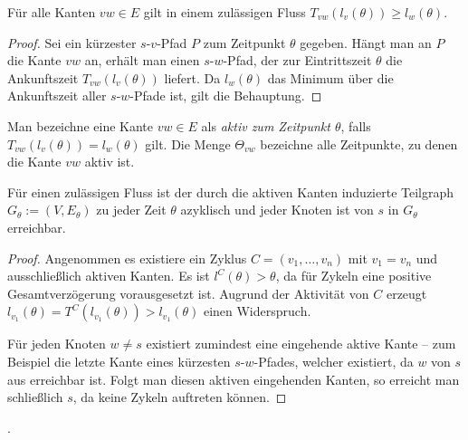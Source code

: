 \begin{lemma}\label{lemma-dreicksungl}
	Für alle Kanten $vw\in E$ gilt in einem zulässigen Fluss 
	$T_{vw}(l_v(\theta)) \geq l_w(\theta)$.
\end{lemma}
\begin{proof}
	Sei ein kürzester $s$-$v$-Pfad $P$ zum Zeitpunkt $\theta$ gegeben.
	Hängt man an $P$ die Kante $vw$ an, erhält man einen $s$-$w$-Pfad, der zur Eintrittszeit $\theta$ die Ankunftszeit $T_{vw}(l_v(\theta))$ liefert.
	Da $l_w(\theta)$ das Minimum über die Ankunftszeit aller $s$-$w$-Pfade ist, gilt die Behauptung.
\end{proof}

\begin{definition}
	Man bezeichne eine Kante $vw\in E$ als \emph{aktiv zum Zeitpunkt $\theta$}, falls $T_{vw}(l_v(\theta)) = l_w(\theta)$ gilt.
	Die Menge $\Theta_{vw}$ bezeichne alle Zeitpunkte, zu denen die Kante $vw$ aktiv ist.
\end{definition}

\begin{lemma}\label{lemma-shortest-path-using-active-edges}
	Für einen zulässigen Fluss ist der durch die aktiven Kanten induzierte Teilgraph $G_\theta:=(V, E_\theta)$ zu jeder Zeit $\theta$ azyklisch und jeder Knoten ist von $s$ in $G_\theta$ erreichbar.
\end{lemma}
\begin{proof}
	Angenommen es existiere ein Zyklus $C=(v_1, \dots, v_n)$ mit $v_1=v_n$ und ausschließlich aktiven Kanten.
	Es ist $l^C(\theta) > \theta$, da für Zykeln eine positive Gesamtverzögerung vorausgesetzt ist.
	Augrund der Aktivität von $C$ erzeugt $l_{v_1}(\theta) = T^C(l_{v_1}(\theta)) > l_{v_1}(\theta)$ einen Widerspruch.
	
	Für jeden Knoten $w\neq s$ existiert zumindest eine eingehende aktive Kante -- zum Beispiel die letzte Kante eines kürzesten $s$-$w$-Pfades, welcher existiert, da $w$ von $s$ aus erreichbar ist.
	Folgt man diesen aktiven eingehenden Kanten, so erreicht man schließlich $s$, da keine Zykeln auftreten können.
\end{proof}

.

